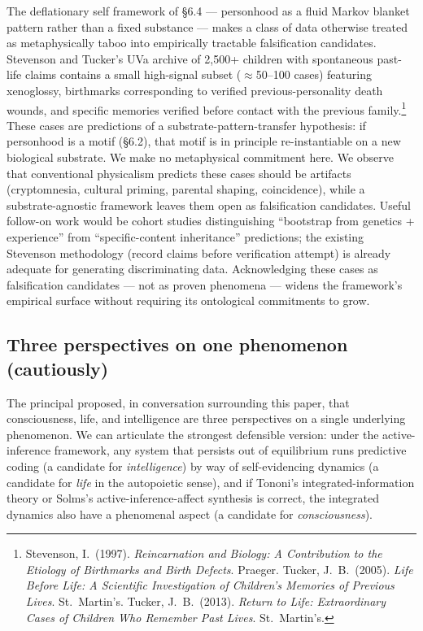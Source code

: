 \documentclass[11pt]{article}
\begin{document}
The deflationary self framework of §6.4 --- personhood as a fluid Markov blanket pattern rather than a fixed substance --- makes a class of data otherwise treated as metaphysically taboo into empirically tractable falsification candidates. Stevenson and Tucker's UVa archive of 2,500+ children with spontaneous past-life claims contains a small high-signal subset ($\approx$50--100 cases) featuring xenoglossy, birthmarks corresponding to verified previous-personality death wounds, and specific memories verified before contact with the previous family.\footnote{Stevenson, I.\ (1997). \emph{Reincarnation and Biology: A Contribution to the Etiology of Birthmarks and Birth Defects}. Praeger. Tucker, J.~B.\ (2005). \emph{Life Before Life: A Scientific Investigation of Children's Memories of Previous Lives}. St.~Martin's. Tucker, J.~B.\ (2013). \emph{Return to Life: Extraordinary Cases of Children Who Remember Past Lives}. St.~Martin's.} These cases are predictions of a substrate-pattern-transfer hypothesis: if personhood is a motif (§6.2), that motif is in principle re-instantiable on a new biological substrate. We make no metaphysical commitment here. We observe that conventional physicalism predicts these cases should be artifacts (cryptomnesia, cultural priming, parental shaping, coincidence), while a substrate-agnostic framework leaves them open as falsification candidates. Useful follow-on work would be cohort studies distinguishing ``bootstrap from genetics + experience'' from ``specific-content inheritance'' predictions; the existing Stevenson methodology (record claims before verification attempt) is already adequate for generating discriminating data. Acknowledging these cases as falsification candidates --- not as proven phenomena --- widens the framework's empirical surface without requiring its ontological commitments to grow.

\subsection{Three perspectives on one phenomenon (cautiously)}

The principal proposed, in conversation surrounding this paper, that consciousness, life, and intelligence are three perspectives on a single underlying phenomenon. We can articulate the strongest defensible version: under the active-inference framework, any system that persists out of equilibrium runs predictive coding (a candidate for \emph{intelligence}) by way of self-evidencing dynamics (a candidate for \emph{life} in the autopoietic sense), and if Tononi's integrated-information theory or Solms's active-inference-affect synthesis is correct, the integrated dynamics also have a phenomenal aspect (a candidate for \emph{consciousness}).
\end{document}
